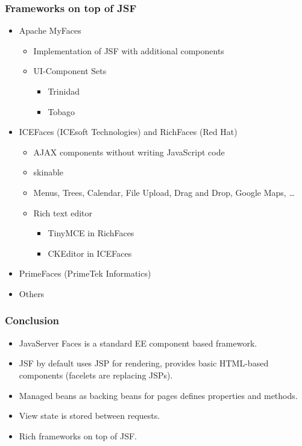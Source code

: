 \documentclass[10pt,xcolor=pdflatex]{beamer}
\begin{document}
\begin{frame}\frametitle{Frameworks on top of JSF}
	\begin{itemize}
		\item Apache MyFaces
          \begin{itemize}
        	\item Implementation of JSF with additional components
        	\item UI-Component Sets 
              \begin{itemize}
                \item Trinidad
                \item Tobago
              \end{itemize}
          \end{itemize}
		\item ICEFaces (ICEsoft Technologies) and RichFaces (Red Hat)
          \begin{itemize}
        	\item AJAX components without writing JavaScript code
        	\item skinable
        	\item Menus, Trees, Calendar, File Upload, Drag and Drop, Google Maps, \ldots
        	\item Rich text editor
              \begin{itemize}
            	\item TinyMCE in RichFaces
            	\item CKEditor in ICEFaces
              \end{itemize}
          \end{itemize}
		\item PrimeFaces (PrimeTek Informatics)
		\item Others
	\end{itemize}
\end{frame}


\begin{frame}\frametitle{Conclusion}
	\begin{itemize}
		\item JavaServer Faces is a standard EE component based framework.
		\item JSF by default uses JSP for rendering, provides basic HTML-based components (facelets are replacing JSPs).
		\item Managed beans as backing beans for pages defines properties and methods.
		\item View state is stored between requests.
		\item Rich frameworks on top of JSF. 
	\end{itemize}
\end{frame}
\end{document}
